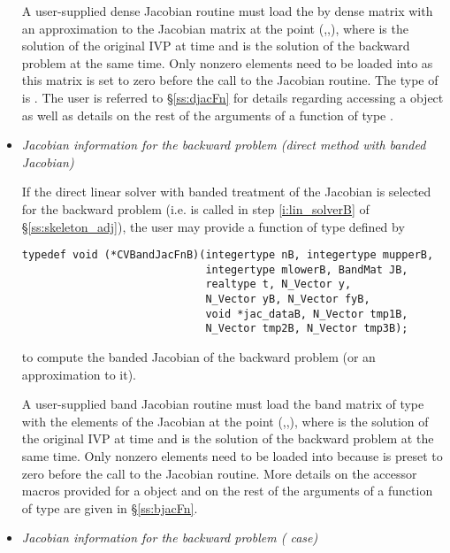 \begin{itemize}
  A user-supplied dense Jacobian routine must load the  by 
  dense matrix  with an approximation to the Jacobian matrix
  at the point (,,), where  is the solution
  of the original IVP at time  and  is the solution of the
  backward problem at the same time.
  Only nonzero elements need to be loaded into  as this matrix 
  is set to zero before the call to the Jacobian routine. 
  The type of  is . The user is referred to 
  \S\ref{ss:djacFn} for details regarding 
  accessing a  object as well as details on the rest of the 
  arguments of a function of type .

\item {\em Jacobian information for the backward problem
    (direct method with banded Jacobian)}

  If the direct linear solver with banded treatment of the Jacobian is selected
  for the backward problem (i.e.  is called in step \ref{i:lin_solverB} 
  of \S\ref{ss:skeleton_adj}), the user may provide a function of type  
  defined by
\begin{verbatim}
typedef void (*CVBandJacFnB)(integertype nB, integertype mupperB, 
                             integertype mlowerB, BandMat JB,
                             realtype t, N_Vector y, 
                             N_Vector yB, N_Vector fyB,
                             void *jac_dataB, N_Vector tmp1B, 
                             N_Vector tmp2B, N_Vector tmp3B);
\end{verbatim}
  to compute the banded Jacobian of the backward problem (or an approximation
  to it).

  A user-supplied band Jacobian routine must load the band matrix 
  of type  with the elements of the Jacobian at the
  point (,,), where  is the solution
  of the original IVP at time  and  is the solution of the
  backward problem at the same time.  
  Only nonzero elements need to be loaded into
   because  is preset to zero before the call to the
  Jacobian routine. More details on the accessor macros provided for
  a  object and on the rest of the arguments of a function
  of type  are given in \S\ref{ss:bjacFn}.

\item {\em Jacobian information for the backward problem
    ({\spgmr} case)}


\end{itemize}
